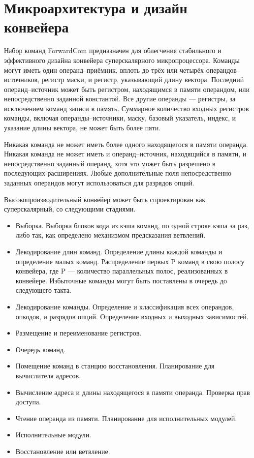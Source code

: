 \documentclass[forwardcom.tex]{subfiles}
\begin{document}
\chapter{Микроархитектура и дизайн конвейера}
Набор команд ForwardCom предназначен для облегчения стабильного и эффективного дизайна конвейера суперскалярного микропроцессора. Команды могут иметь один операнд--приёмник, вплоть до трёх или четырёх операндов--источников, регистр маски, и регистр, указывающий длину вектора. Последний операнд--источник может быть регистром, находящимся в памяти операндом, или непосредственно заданной константой. Все другие операнды --- регистры, за исключением команд записи в память. Суммарное количество входных регистров команды, включая операнды--источники, маску, базовый указатель, индекс, и указание длины вектора, не может быть более пяти.

Никакая команда не может иметь более одного находящегося в памяти операнда. Никакая команда не может иметь и операнд--источник, находящийся в памяти, и непосредственно заданный операнд, хотя это может быть разрешено в последующих расширениях. Любые дополнительные поля непосредственно заданных операндов могут использоваться для разрядов опций. 

Высокопроизводительный конвейер может быть спроектирован как суперскалярный, со следующими стадиями.
\begin{itemize}
\item Выборка. Выборка блоков кода из кэша команд, по одной строке кэша за раз, либо так, как определено механизмом предсказания ветвлений. 

\item Декодирование длин команд. Определение длины каждой команды и определение малых команд. Распределение первых P команд в свою полосу конвейера, где P --- количество параллельных полос, реализованных в конвейере. Избыточные команды могут быть поставлены в очередь до следующего такта. 

\item Декодирование команды. Определение и классификация всех операндов, опкодов, и разрядов опций. Определение входных и выходных зависимостей.

\item Размещение и переименование регистров.

\item Очередь команд. 

\item Помещение команд в станцию восстановления. Планирование для вычислителя адресов. 

\item Вычисление адреса и длины находящегося в памяти операнда. Проверка прав доступа.

\item Чтение операнда из памяти. Планирование для исполнительных модулей.  

\item Исполнительные модули.  

\item Восстановление или ветвление. 
\end{itemize}
\end{document}
